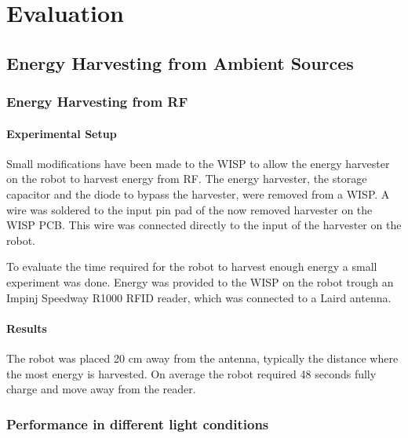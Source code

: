 \chapter{Evaluation} 



\section{Energy Harvesting from Ambient Sources}

\subsection{Energy Harvesting from RF}


\subsubsection{Experimental Setup}

Small modifications have been made to the WISP to allow the energy harvester on the robot to harvest energy from RF.
The energy harvester, the storage capacitor and the diode to bypass the harvester, were removed from a WISP.
A wire was soldered to the input pin pad of the now removed harvester on the WISP PCB.
This wire was connected directly to the input of the harvester on the robot.

To evaluate the time required for the robot to harvest enough energy a small experiment was done.
Energy was provided to the WISP on the robot trough an Impinj Speedway R1000 RFID reader, which was connected to a Laird antenna.

\subsubsection{Results}
The robot was placed 20 cm away from the antenna, typically the distance where the most energy is harvested.
On average the robot required 48 seconds fully charge and move away from the reader.

\subsection{Performance in different light conditions}

